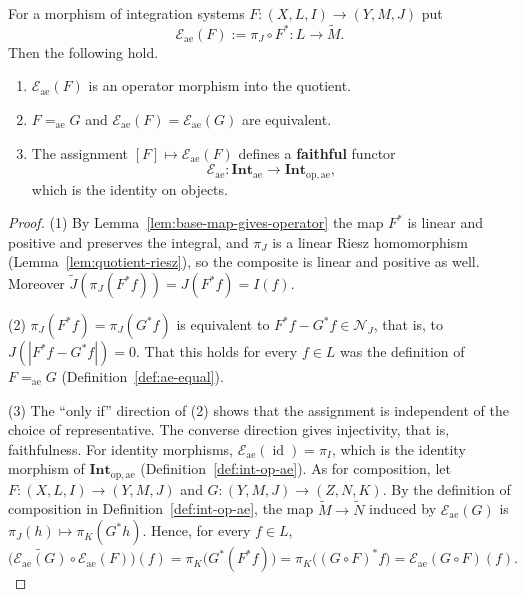 \begin{lemma}\label{lem:E-descends-to-ae}
  For a morphism of integration systems
  $F:(X,L,I)\to(Y,M,J)$ put
  \[
    \mathcal{E}_{\mathrm{ae}}(F):=\pi_J\circ F^*:L\to\widetilde{M} .
  \]
  Then the following hold.
  \begin{enumerate}
    \item $\mathcal{E}_{\mathrm{ae}}(F)$ is an operator morphism into the
      quotient.
    \item $F=_{\mathrm{ae}}G$ and
      $\mathcal{E}_{\mathrm{ae}}(F)=\mathcal{E}_{\mathrm{ae}}(G)$ are
      equivalent.
    \item The assignment $[F]\mapsto\mathcal{E}_{\mathrm{ae}}(F)$ defines a
      \textbf{faithful} functor
      \[
        \mathcal{E}_{\mathrm{ae}}:
        \mathbf{Int}_{\mathrm{ae}}\to\mathbf{Int}_{\mathrm{op},\mathrm{ae}} ,
      \]
      which is the identity on objects.
  \end{enumerate}
\end{lemma}
\begin{proof}
  (1) By Lemma~\ref{lem:base-map-gives-operator} the map $F^*$ is linear and
  positive and preserves the integral, and $\pi_J$ is a linear Riesz
  homomorphism (Lemma~\ref{lem:quotient-riesz}), so the composite is linear and
  positive as well.
  Moreover $\widetilde{J}(\pi_J(F^*f))=J(F^*f)=I(f)$.

  (2) $\pi_J(F^*f)=\pi_J(G^*f)$ is equivalent to
  $F^*f-G^*f\in\mathcal{N}_J$, that is, to
  $J(|F^*f-G^*f|)=0$.
  That this holds for every $f\in L$ was the definition of
  $F=_{\mathrm{ae}}G$ (Definition~\ref{def:ae-equal}).

  (3) The ``only if'' direction of (2) shows that the assignment is independent
  of the choice of representative.
  The converse direction gives injectivity, that is, faithfulness.
  For identity morphisms,
  $\mathcal{E}_{\mathrm{ae}}(\operatorname{id})=\pi_I$, which is the identity
  morphism of $\mathbf{Int}_{\mathrm{op},\mathrm{ae}}$
  (Definition~\ref{def:int-op-ae}).
  As for composition, let $F:(X,L,I)\to(Y,M,J)$ and
  $G:(Y,M,J)\to(Z,N,K)$. By the definition of composition in
  Definition~\ref{def:int-op-ae}, the map
  $\widetilde{M}\to\widetilde{N}$ induced by
  $\mathcal{E}_{\mathrm{ae}}(G)$ is $\pi_J(h)\mapsto\pi_K(G^*h)$. Hence, for
  every $f\in L$,
  \[
    \bigl(\widetilde{\mathcal{E}_{\mathrm{ae}}(G)}\circ\mathcal{E}_{\mathrm{ae}}(F)\bigr)(f)
    =\pi_K\bigl(G^*(F^*f)\bigr)
    =\pi_K\bigl((G\circ F)^*f\bigr)
    =\mathcal{E}_{\mathrm{ae}}(G\circ F)(f) .
  \]
\end{proof}

